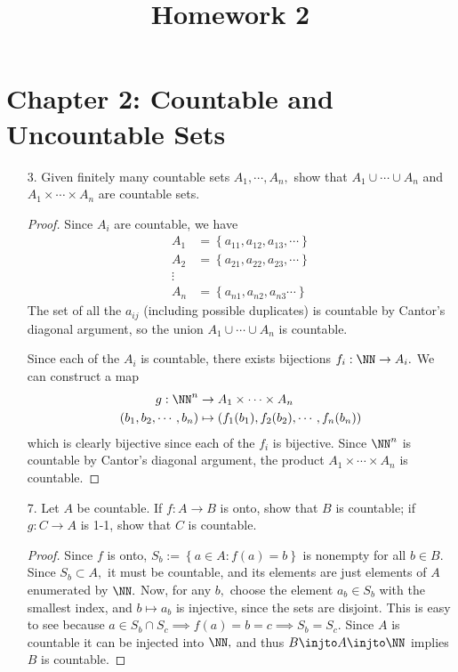 \documentclass{article}
\begin{document}
\title{Homework 2}
\maketitle
\thispagestyle{fancy}

\section*{Chapter 2: Countable and Uncountable Sets}

\begin{itemize}
	\item[3.] Given finitely many countable sets $A_1, \cdots, A_n,$ show that $A_1\cup\cdots\cup A_n$ and $A_1\times\cdots\times A_n$ are countable sets.
		\begin{proof}
			Since $A_i$ are countable, we have
			\begin{align*}
				A_1 &= \left\{ a_{11}, a_{12}, a_{13}, \cdots \right\} \\
				A_2 &= \left\{ a_{21}, a_{22}, a_{23}, \cdots \right\} \\
				\vdots \\
				A_n &= \left\{ a_{n1}, a_{n2}, a_{n3}\cdots \right\}
			\end{align*}
			The set of all the $a_{ij}$ (including possible duplicates) is countable by Cantor's diagonal argument, so the union $A_1\cup\cdots\cup A_n$ is countable.

			Since each of the $A_i$ is countable, there exists bijections $f_i:\NN\to A_i.$ We can construct a map 
			\begin{align*}
				g:\NN^n &\to A_1\times\cdots\times A_n \\
				(b_1, b_2, \cdots, b_n) &\mapsto (f_1(b_1), f_2(b_2), \cdots, f_n(b_n))
			\end{align*}
			which is clearly bijective since each of the $f_i$ is bijective. Since $\NN^n$ is countable by Cantor's diagonal argument, the product $A_1\times\cdots\times A_n$ is countable.
		\end{proof}

	\item[7.] Let $A$ be countable. If $f:A\to B$ is onto, show that $B$ is countable; if $g:C\to A$ is 1-1, show that $C$ is countable.
		\begin{proof}
			Since $f$ is onto, $S_b:=\left\{ a\in A:f(a)=b \right\}$ is nonempty for all $b\in B.$ Since $S_b\subset A,$ it must be countable, and its elements are just elements of $A$ enumerated by $\NN.$ Now, for any $b,$ choose the element $a_b\in S_b$ with the smallest index, and $b\mapsto a_b$ is injective, since the sets are disjoint. This is easy to see because $a\in S_b\cap S_c\implies f(a)=b=c\implies S_b=S_c.$ Since $A$ is countable it can be injected into $\NN,$ and thus $B\injto A\injto \NN$ implies $B$ is countable.


\end{proof}
\end{itemize}
\end{document}
